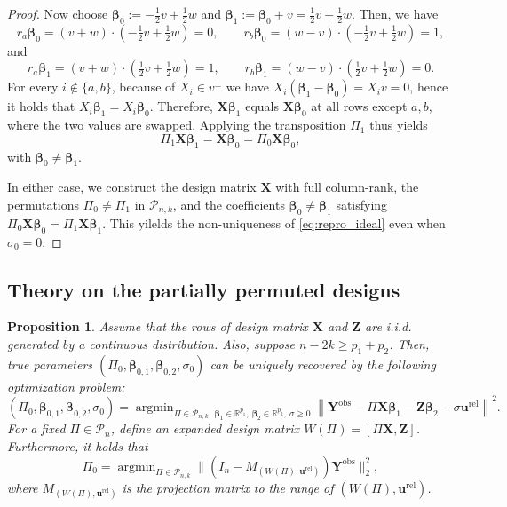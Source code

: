 \documentclass[11pt, reqno]{amsart}
\newcommand{\R}{\mathbb{R}}
\renewcommand{\ge}{\geqslant}
\newcommand{\mP}{\mathcal{P}}
\newcommand{\1}{\mbox{1}\hspace{-0.25em}\mbox{l}}
\newcommand{\obs}{\mathrm{obs}}
\newcommand{\rel}{\mathrm{rel}}
\DeclareMathOperator*{\argmin}{argmin}
\theoremstyle{definition}\newtheorem{problem}{Problem}[section]
\theoremstyle{definition}\newtheorem{definition}[problem]{Definition}
\theoremstyle{remark}\newtheorem{assumption}{Assumption}
\theoremstyle{remark}\newtheorem{remark}[problem]{Remark}
\theoremstyle{definition}\newtheorem{example}[problem]{Example}
\theoremstyle{plain}\newtheorem{theorem}[problem]{Theorem}
\theoremstyle{plain}\newtheorem{question}[problem]{Question}
\theoremstyle{plain}\newtheorem{lemma}[problem]{Lemma}
\theoremstyle{plain}\newtheorem{proposition}[problem]{Proposition}
\theoremstyle{plain}\newtheorem{corollary}[problem]{Corollary}
\theoremstyle{plain}\newtheorem{conjecture}[problem]{Conjecture}
\begin{document}
\begin{proof}
Now choose $\bm\beta_0:=-\tfrac12 v+\tfrac12 w$ and $\bm\beta_1:=\bm\beta_0+v=\tfrac12 v+\tfrac12 w$.
Then, we have
\[
r_a\bm\beta_0=(v+w)\cdot\left(-\tfrac12 v+\tfrac12 w\right)=0,\qquad
r_b\bm\beta_0=(w-v)\cdot\left(-\tfrac12 v+\tfrac12 w\right)=1,
\]
and
\[
r_a\bm\beta_1=(v+w)\cdot\left(\tfrac12 v+\tfrac12 w\right)=1,\qquad
r_b\bm\beta_1=(w-v)\cdot\left(\tfrac12 v+\tfrac12 w\right)=0.
\]
For every $i\notin\{a,b\}$, because of $X_i\in v^\perp$ we have $X_i(\bm\beta_1-\bm\beta_0)=X_i v=0$, hence it holds that $X_i\bm\beta_1=X_i\bm\beta_0$.
Therefore, $\bm X\bm\beta_1$ equals $\bm X\bm\beta_0$ at all rows except $a,b$, where the two values are swapped.
Applying the transposition $\Pi_1$ thus yields
\[
\Pi_1\bm X\bm\beta_1=\bm X\bm\beta_0=\Pi_0\bm X\bm\beta_0,
\]
with $\bm\beta_0\ne\bm\beta_1$.

In either case, we construct the design matrix $\bm X$ with full column-rank, the permutations $\Pi_0\ne\Pi_1$ in $\mP_{n,k}$, and the coefficients $\bm\beta_0\ne\bm\beta_1$
satisfying $\Pi_0\bm X\bm\beta_0=\Pi_1\bm X\bm\beta_1$. This yilelds the non-uniqueness of \eqref{eq:repro_ideal} even when $\sigma_0=0$.
\end{proof}


\subsection{Theory on the partially permuted designs}

\begin{proposition}\label{prop:identification partial}
    Assume that the rows of design matrix $\bm{X}$ and $\bm{Z}$ are i.i.d. generated by a continuous distribution. Also, suppose $n - 2k \ge p_1 + p_2$. Then, true parameters
$(\Pi_0,\bm\beta_{0,1},\bm\beta_{0,2},\sigma_0)$ can be uniquely recovered by the following optimization problem:
\begin{equation}\label{eq:repro-ideal-partial}
(\Pi_0,\bm\beta_{0,1},\bm\beta_{0,2},\sigma_0)
=
\argmin_{\Pi\in\mP_{n,k},\ \bm\beta_1\in\R^{p_1},\ \bm\beta_2\in\R^{p_2},\ \sigma\ge 0}
\left\|
\bm Y^{\obs}-\Pi \bm X\bm\beta_1-\bm Z\bm\beta_2-\sigma \bm u^{\rel}
\right\|^2 .
\end{equation}
For a fixed $\Pi \in \mP_n$, define an expanded design matrix $W(\Pi) = [\Pi \bm{X}, \bm{Z}]$. Furthermore, it holds that
\begin{equation}
   \Pi_0 = \argmin_{\Pi \in \mP_{n,k}}\| (I_n - M_{(W(\Pi), \bm{u}^{\rel})}) \bm{Y}^{\obs}\|_2^2,
\end{equation}
where $M_{(W(\Pi), \bm{u}^{\rel})}$ is the projection matrix to the range of $(W(\Pi), \bm{u}^{\rel})$. 
\end{proposition}
\end{document}
